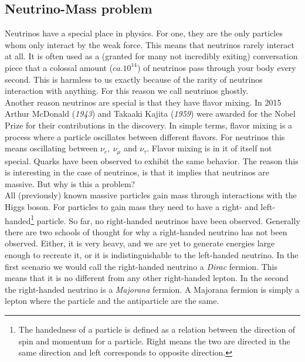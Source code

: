 \subsection{Neutrino-Mass problem}
Neutrinos have a special place in physics. For one, they are the only particles whom
only interact by the weak force. This means that neutrinos rarely interact at all. It is often used
as a (granted for many not incredibly exiting) conversation piece that a colossal amount ($ca.10^{14}$) of 
neutrinos pass through your body every second. This is harmless to us exactly because of the rarity
of neutrinos interaction with anything. For this reason we call neutrinos ghostly. 
\\
Another reason neutrinos are special is that they have flavor mixing. In 2015 Arthur McDonald (\emph{1943}) and 
Takaaki Kajita (\emph{1959}) were awarded for the Nobel Prize for their contributions in the discovery. In simple terms,
flavor mixing is a process where a particle oscillates between different flavors. For neutrinos this 
means oscillating between $\nu_e,\ \nu_\mu$ and $\nu_\tau$. Flavor mixing is in it of itself not special.
Quarks have been observed to exhibit the same behavior. The reason this is interesting in the case of 
neutrinos, is that it implies that neutrinos are massive. But why is this a problem?
\\
All (previously) known massive particles gain mass through interactions with the Higgs boson. For particles
to gain mass they need to have a right- and left-handed\footnote{The handedness of a particle is defined
as a relation between the direction of spin and momentum for a particle. Right means the two are directed
in the same direction and left corresponds to opposite direction.} particle. So far, no right-handed neutrinos
have been observed. Generally there are two schools of thought for why a right-handed neutrino has not been 
observed. Either, it is very heavy, and we are yet to generate energies large enough to recreate it, or 
it is indistinguishable to the left-handed neutrino. In the first scenario we would call the right-handed 
neutrino a \emph{Dirac} fermion. This means that it is no different from any other right-handed lepton. In the second
the right-handed neutrino is a \emph{Majorana} fermion. A Majorana fermion is simply a lepton where the particle
and the antiparticle are the same.
